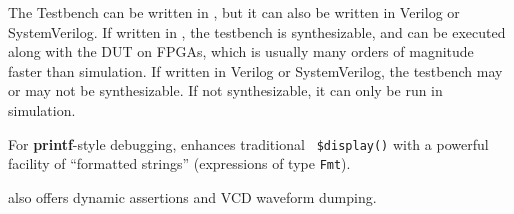 The Testbench can be written in {\BSV}, but it can also be written in
Verilog or SystemVerilog.  If written in {\BSV}, the testbench is
synthesizable, and can be executed along with the DUT on FPGAs, which
is usually many orders of magnitude faster than simulation.  If
written in Verilog or SystemVerilog, the testbench may or may not be
synthesizable.  If not synthesizable, it can only be run in
simulation.


For {\bf printf}-style debugging, {\BSV} enhances traditional {\tt
\$display()} with a powerful facility of ``formatted strings''
(expressions of type {\tt Fmt}).

{\BSV} also offers dynamic assertions and VCD waveform dumping.

